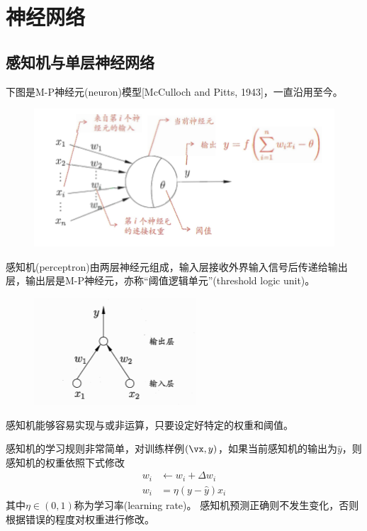 
\section{神经网络}
\subsection{感知机与单层神经网络}
下图是M-P神经元(neuron)模型[McCulloch and Pitts, 1943]，一直沿用至今。
\begin{figure}[H]
\centering
\includegraphics[width=0.6\linewidth]{fig/MP-neuron.png}
\end{figure}

感知机(perceptron)由两层神经元组成，输入层接收外界输入信号后传递给输出层，输出层是M-P神经元，亦称``阈值逻辑单元''(threshold logic unit)。
\begin{figure}[H]
\centering
\includegraphics[width=0.4\linewidth]{fig/perceptron.png}
\end{figure}

感知机能够容易实现与或非运算，只要设定好特定的权重和阈值。

感知机的学习规则非常简单，对训练样例$(\vx,y)$，如果当前感知机的输出为$\hat{y}$，则感知机的权重依照下式修改
\[\begin{aligned}
w_i&\gets w_i+\Delta w_i\\
w_i&= \eta(y-\hat{y})x_i
\end{aligned}\]
其中$\eta\in(0,1)$称为学习率(learning rate)。
感知机预测正确则不发生变化，否则根据错误的程度对权重进行修改。

